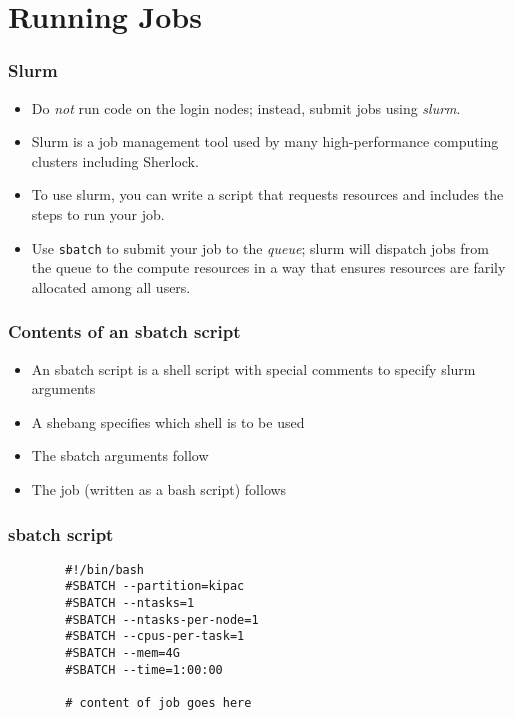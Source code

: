\documentclass[aspectratio=169]{beamer}
\begin{document}
\section{Running Jobs}

\frame{\sectionpage}

\begin{frame}
	\frametitle{Slurm}
	\begin{itemize}
		\item Do \emph{not} run code on the login nodes; instead, submit jobs using \emph{slurm}.
		\item Slurm is a job management tool used by many high-performance computing clusters including Sherlock.
		\item To use slurm, you can write a script that requests resources and includes the steps to run your job.
		\item Use \texttt{sbatch} to submit your job to the \emph{queue}; slurm will dispatch jobs from the queue to the compute resources in a way that ensures resources are farily allocated among all users.
	\end{itemize}
\end{frame}




\begin{frame}
	\frametitle{Contents of an sbatch script}
	\begin{itemize}
		\item An sbatch script is a shell script with special comments to specify slurm arguments
		\item A shebang specifies which shell is to be used
		\item The sbatch arguments follow
		\item The job (written as a bash script) follows
	\end{itemize}
\end{frame}

\begin{frame}[fragile]
	\frametitle{sbatch script}
	\begin{verbatim}
		#!/bin/bash
		#SBATCH --partition=kipac
		#SBATCH --ntasks=1
		#SBATCH --ntasks-per-node=1
		#SBATCH --cpus-per-task=1
		#SBATCH --mem=4G
		#SBATCH --time=1:00:00
		
		# content of job goes here
	\end{verbatim}
\end{frame}
\end{document}
